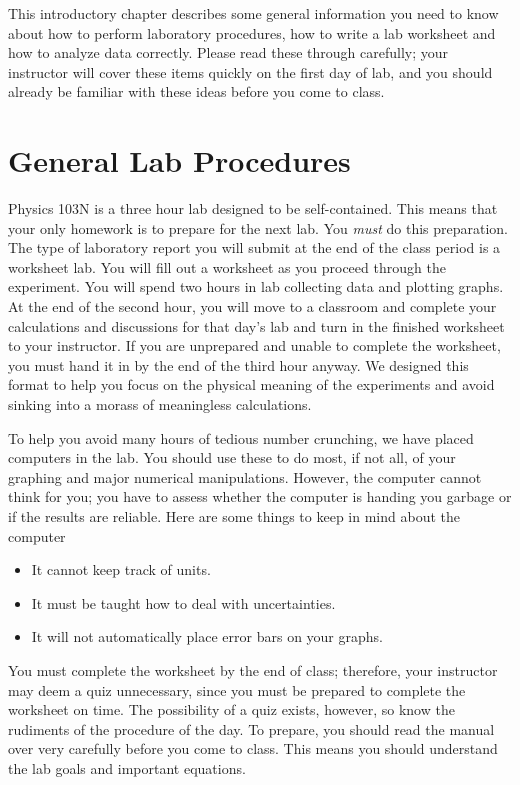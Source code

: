 This introductory chapter describes some general information you
need to know about how to perform laboratory procedures, how to write a 
lab worksheet and how to
analyze data correctly. Please read these through carefully; your instructor 
will cover these items quickly on the first day of lab, and you should already
be familiar with these ideas before you come to class.

\section{General Lab Procedures}

Physics 103N is a three hour lab designed to be self-contained.
This means that your only homework is to prepare for the next lab.
You {\it must} do this preparation.  
The type of laboratory report you will submit at
the end of the class period is a worksheet lab.  You will fill
out a worksheet as you proceed through the experiment.
You will spend
two hours in lab collecting data and plotting graphs.  At the end of the
second hour, you will move to a classroom and complete your calculations
and discussions for that day's lab and turn in the finished worksheet
to your instructor.    If you are unprepared and unable
to complete the worksheet, you must hand it in by the end of the third hour
anyway.
We designed this format to help you 
focus on the physical meaning of the experiments and avoid sinking into a 
morass of meaningless calculations. 

To help you avoid many hours of tedious number crunching, we have placed 
computers in the lab. You should use these to do most, if not all, of your 
graphing and major numerical manipulations. However, the computer cannot think
for you; you have to assess whether the computer is handing you garbage or if 
the results are reliable. Here are some things to keep in mind about the 
computer
\begin{itemize}
\item  It cannot keep track of units.
\item  It must be taught how to deal with uncertainties.
\item  It will not automatically place error bars on your graphs.
\end{itemize}

You must complete the worksheet by the end of class; therefore, your 
instructor may deem a quiz unnecessary, since you must be prepared to complete
the worksheet on time.  The possibility of a quiz exists, however, so know
the rudiments of the procedure of the day. To prepare, you should read the 
manual over very carefully before you come to class. This means you should 
understand the lab goals and important equations.


